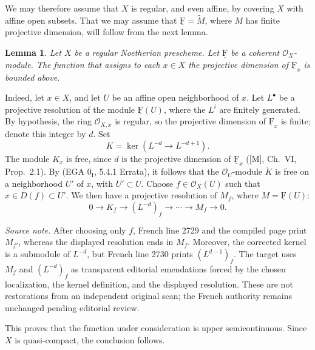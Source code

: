 \documentclass[10pt,a4paper]{article}
\newcommand{\uF}{\underline{\mathrm F}}
\newcommand{\cF}{\uF}
\newcommand{\cO}{\mathcal O}
\theoremstyle{sgatheorem}
\theoremstyle{plain}
\newtheorem{lemma}{Lemma}[section]
\numberwithin{equation}{section}
\begin{document}
We may therefore assume that $X$ is regular, and even affine, by covering
$X$ with affine open subsets. That we may assume that $\cF=\widetilde M$, where
$M$ has finite projective dimension, will follow from the next lemma.

\begin{lemma}\label{VIII.2.4}
Let $X$ be a regular Noetherian prescheme. Let $\cF$ be a coherent
$\mathcal O_X$-module. The function that assigns to each $x\in X$ the
projective dimension of $\cF_x$ is bounded above.
\end{lemma}


\setcounter{equation}{1}
\medskip
Indeed, let $x\in X$, and let $U$ be an affine open neighborhood of $x$.
Let $L^\bullet$ be a projective resolution of the module $\cF(U)$, where the
$L^i$ are finitely generated. By hypothesis, the ring $\cO_{X,x}$ is regular,
so the projective dimension of $\cF_x$ is finite; denote this integer by $d$.
Set
\[
  K=\ker(L^{-d}\longrightarrow L^{-d+1}).
\]
The module $K_x$ is free, since $d$ is the projective dimension of $\cF_x$
([M], Ch.~VI, Prop.~2.1). By (EGA $0_{\mathrm I}$, 5.4.1 Errata), it follows
that the $\cO_U$-module $\widetilde K$ is free on a neighborhood $U'$ of $x$,
with $U'\subset U$. Choose $f\in\cO_X(U)$ such that
$x\in D(f)\subset U'$. We then have a projective resolution of $M_f$, where
$M=\cF(U)$:
\[
  0\longrightarrow K_f\longrightarrow (L^{-d})_f\longrightarrow
  \cdots\longrightarrow M_f\longrightarrow 0.
\]

\noindent\emph{Source note.} After choosing only $f$, French line 2729 and
the compiled page print $M_{f'}$, whereas the displayed resolution ends in
$M_f$. Moreover, the corrected kernel is a submodule of $L^{-d}$, but French
line 2730 prints $(L^{d-1})_f$. The target uses $M_f$ and $(L^{-d})_f$ as
transparent editorial emendations forced by the chosen localization, the
kernel definition, and the displayed resolution. These are not restorations
from an independent original scan; the French authority remains unchanged
pending editorial review.

This proves that the function under consideration is upper semicontinuous.
Since $X$ is quasi-compact, the conclusion follows.

\end{document}
